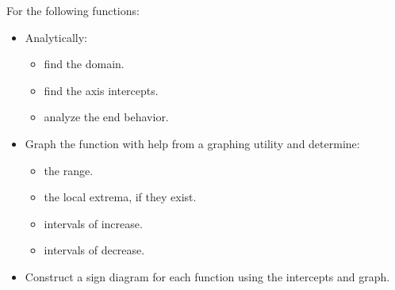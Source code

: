 \begin{ex}  For the following functions:

\begin{itemize}

\item Analytically:

\begin{multicols}{3}

\begin{itemize}

\item find the domain.

\item find the axis intercepts.

\item analyze the end behavior.

\end{itemize}

\end{multicols}

\newpage

\item Graph the function with help from a graphing utility and determine:

\begin{multicols}{2}

\begin{itemize}

\item  the range.

\item the local extrema, if they exist.

\end{itemize}

\end{multicols}

\begin{multicols}{2}

\begin{itemize}

\item intervals of increase.

\item intervals of decrease.

\end{itemize}

\end{multicols}

\item Construct a sign diagram for each function using the intercepts and graph.


\end{itemize}
\end{ex}
